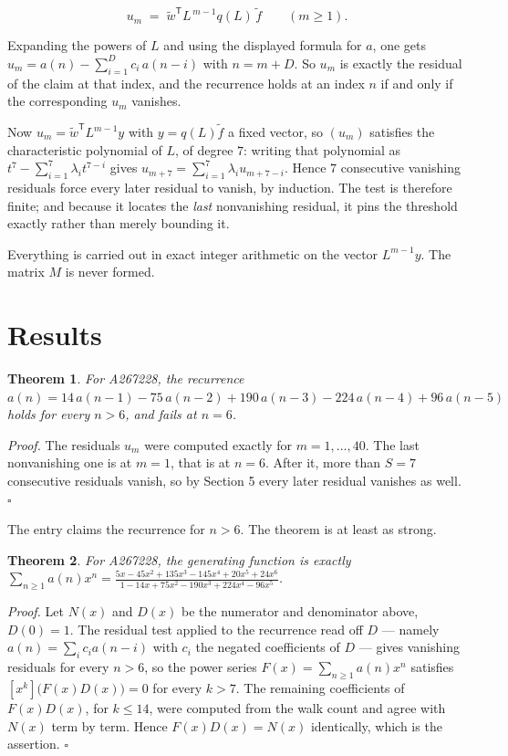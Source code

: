 \documentclass[11pt]{article}
\newtheorem{theorem}{Theorem}
\theoremstyle{definition}
\begin{document}
\[u_m \;=\; \tilde w^{\mathsf T} L^{\,m-1} q(L)\,\tilde f \qquad (m \ge 1).\]

Expanding the powers of $L$ and using the displayed formula for $a$, one gets $u_m = a(n) - \sum_{i=1}^{D} c_i\,a(n-i)$ with $n = m + D$. So $u_m$ is exactly the residual of the claim at that index, and the recurrence holds at an index $n$ if and only if the corresponding $u_m$ vanishes.

Now $u_m = \tilde w^{\mathsf T} L^{m-1} y$ with $y = q(L)\tilde f$ a fixed vector, so $(u_m)$ satisfies the characteristic polynomial of $L$, of degree $7$: writing that polynomial as $t^{7} - \sum_{i=1}^{7} \lambda_i t^{7-i}$ gives $u_{m+7} = \sum_{i=1}^{7} \lambda_i u_{m+7-i}$. Hence $7$ consecutive vanishing residuals force every later residual to vanish, by induction. The test is therefore finite; and because it locates the {\itshape last} nonvanishing residual, it pins the threshold exactly rather than merely bounding it.

Everything is carried out in exact integer arithmetic on the vector $L^{m-1}y$. The matrix $M$ is never formed.

\section{Results}

\begin{theorem} For A267228, the recurrence $a(n) = 14\,a(n-1) - 75\,a(n-2) + 190\,a(n-3) - 224\,a(n-4) + 96\,a(n-5)$ holds for every $n > 6$, and fails at $n = 6$.\end{theorem}

{\itshape Proof.} The residuals $u_m$ were computed exactly for $m = 1,\dots,40$. The last nonvanishing one is at $m = 1$, that is at $n = 6$. After it, more than $S = 7$ consecutive residuals vanish, so by Section 5 every later residual vanishes as well. $\square$

The entry claims the recurrence for $n > 6$. The theorem is at least as strong.

\begin{theorem} For A267228, the generating function is exactly $\sum_{n\ge 1} a(n)x^n = \frac{5x - 45x^{2} + 135x^{3} - 145x^{4} + 20x^{5} + 24x^{6}}{1 - 14x + 75x^{2} - 190x^{3} + 224x^{4} - 96x^{5}}$.\end{theorem}

{\itshape Proof.} Let $N(x)$ and $D(x)$ be the numerator and denominator above, $D(0)=1$. The residual test applied to the recurrence read off $D$ --- namely $a(n) = \sum_i c_i a(n-i)$ with $c_i$ the negated coefficients of $D$ --- gives vanishing residuals for every $n > 6$, so the power series $F(x)=\sum_{n\ge 1}a(n)x^n$ satisfies $[x^k]\bigl(F(x)D(x)\bigr) = 0$ for every $k > 7$. The remaining coefficients of $F(x)D(x)$, for $k \le 14$, were computed from the walk count and agree with $N(x)$ term by term. Hence $F(x)D(x) = N(x)$ identically, which is the assertion. $\square$
\end{document}
